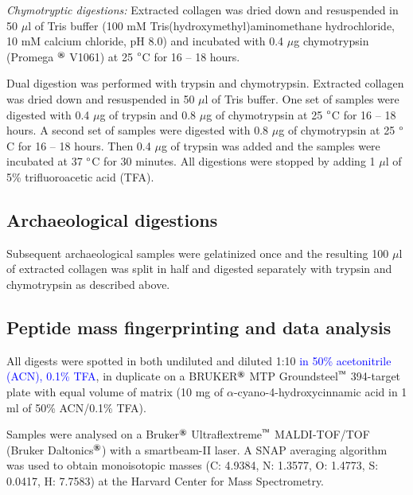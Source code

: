 \documentclass[preprint, 3p, authoryear]{elsarticle} %
\begin{document}
\emph{Chymotryptic digestions:} Extracted collagen was dried down and resuspended in 50 \(\mu\)l of Tris buffer (100 mM Tris(hydroxymethyl)aminomethane hydrochloride, 10 mM calcium chloride, pH 8.0) and incubated with 0.4 \(\mu\)g chymotrypsin (Promega \(^\text{\textregistered}\) V1061) at 25 \(\text{\textdegree}\)C for 16 -- 18 hours.

Dual digestion was performed with trypsin and chymotrypsin. Extracted collagen was dried down and resuspended in 50 \(\mu\)l of Tris buffer. One set of samples were digested with 0.4 \(\mu\)g of trypsin and 0.8 \(\mu\)g of chymotrypsin at 25 \(\text{\textdegree}\)C for 16 -- 18 hours. A second set of samples were digested with 0.8 \(\mu\)g of chymotrypsin at 25 \(\text{\textdegree}\)C for 16 -- 18 hours. Then 0.4 \(\mu\)g of trypsin was added and the samples were incubated at 37 \(\text{\textdegree}\)C for 30 minutes. All digestions were stopped by adding 1 \(\mu\)l of 5\% trifluoroacetic acid (TFA).

\hypertarget{archaeological-digestions}{%
\subsection{Archaeological digestions}\label{archaeological-digestions}}

Subsequent archaeological samples were gelatinized once and the resulting 100 \(\mu\)l of extracted collagen was split in half and digested separately with trypsin and chymotrypsin as described above.

\hypertarget{peptide-mass-fingerprinting-and-data-analysis}{%
\subsection{Peptide mass fingerprinting and data analysis}\label{peptide-mass-fingerprinting-and-data-analysis}}

All digests were spotted in both undiluted and diluted 1:10 \textcolor{blue}{in 50\% acetonitrile (ACN), 0.1\% TFA}, in duplicate on a BRUKER\(^\text{\textregistered}\) MTP Groundsteel\(^\text{\texttrademark}\) 394-target plate with equal volume of matrix (10 mg of \(\alpha\)-cyano-4-hydroxycinnamic acid in 1 ml of 50\% ACN/0.1\% TFA).

Samples were analysed on a Bruker\(^\text{\textregistered}\) Ultraflextreme\(^\text{\texttrademark}\) MALDI-TOF/TOF (Bruker Daltonics\(^\text{\textregistered}\)) with a smartbeam-II laser. A SNAP averaging algorithm was used to obtain monoisotopic masses (C: 4.9384, N: 1.3577, O: 1.4773, S: 0.0417, H: 7.7583) at the Harvard Center for Mass Spectrometry.
\end{document}
